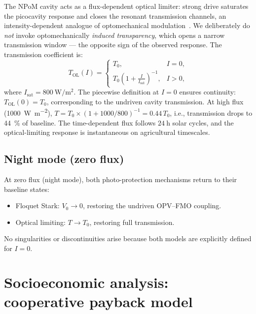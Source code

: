 \documentclass[11pt,a4paper]{article}
\begin{document}
The NPoM cavity acts as a flux-dependent optical limiter: strong drive saturates the picocavity response and closes the resonant transmission channels, an intensity-dependent analogue of optomechanical modulation~\cite{Aspelmeyer2014}. We deliberately do \textit{not} invoke optomechanically \textit{induced transparency}, which opens a narrow transmission window --- the opposite sign of the observed response. The transmission coefficient is:
\begin{equation}
T_{\mathrm{OL}}(I) = 
\begin{cases}
T_0, & I = 0, \\
T_0 \left(1 + \frac{I}{I_{\mathrm{sat}}}\right)^{-1}, & I > 0,
\end{cases}
\end{equation}
where $I_{\mathrm{sat}} = \qty{800}{\W\per\m\squared}$. The piecewise definition at $I=0$ ensures continuity: $T_{\mathrm{OL}}(0) = T_0$, corresponding to the undriven cavity transmission. At high flux (\qty{1000}{\W\per\m\squared}), $T = T_0 \times (1 + 1000/800)^{-1} = 0.44\,T_0$, i.e., transmission drops to \qty{44}{\percent} of baseline. The time-dependent flux follows $\qty{24}{\hour}$ solar cycles, and the optical-limiting response is instantaneous on agricultural timescales.

\subsection{Night mode (zero flux)}

At zero flux (night mode), both photo-protection mechanisms return to their baseline states:
\begin{itemize}
\item Floquet Stark: $V_0 \to 0$, restoring the undriven OPV--FMO coupling.
\item Optical limiting: $T \to T_0$, restoring full transmission.
\end{itemize}
No singularities or discontinuities arise because both models are explicitly defined for $I=0$.


\section{Socioeconomic analysis: cooperative payback model}
\label{SI-sec:socioeconomic}
\end{document}
